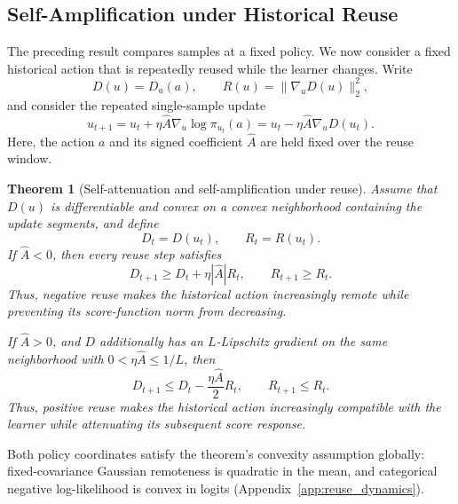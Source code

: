 \documentclass{article}
\theoremstyle{plain}
\newtheorem{theorem}{Theorem}[section]
\theoremstyle{definition}
\theoremstyle{remark}
\begin{document}
\subsection{Self-Amplification under Historical Reuse}
\label{sec:self_amplification}

The preceding result compares samples at a fixed policy. We now consider
a fixed historical action that is repeatedly reused while the learner
changes. Write
\[
    D(u)=D_u(a),
    \qquad
    R(u)=\|\nabla_uD(u)\|_2^2,
\]
and consider the repeated single-sample update
\begin{equation}
    u_{t+1}
    =
    u_t
    +
    \eta\widehat A\nabla_u\log\pi_{u_t}(a)
    =
    u_t
    -
    \eta\widehat A\nabla_uD(u_t).
    \label{eq:single_sample_reuse_update}
\end{equation}
Here, the action \(a\) and its signed coefficient \(\widehat A\) are
held fixed over the reuse window.

\begin{theorem}[Self-attenuation and self-amplification under reuse]
\label{thm:reuse_dynamics}
Assume that \(D(u)\) is differentiable and convex on a convex
neighborhood containing the update segments, and define
\[
    D_t=D(u_t),
    \qquad
    R_t=R(u_t).
\]
If \(\widehat A<0\), then every reuse step satisfies
\begin{equation}
    D_{t+1}
    \ge
    D_t+\eta|\widehat A|R_t,
    \qquad
    R_{t+1}\ge R_t.
    \label{eq:negative_reuse_amplification}
\end{equation}
Thus, negative reuse makes the historical action increasingly remote
while preventing its score-function norm from decreasing.

If \(\widehat A>0\), and \(D\) additionally has an \(L\)-Lipschitz
gradient on the same neighborhood with \(0<\eta\widehat A\le 1/L\), then
\begin{equation}
    D_{t+1}
    \le
    D_t-\frac{\eta\widehat A}{2}R_t,
    \qquad
    R_{t+1}\le R_t.
    \label{eq:positive_reuse_attenuation}
\end{equation}
Thus, positive reuse makes the historical action increasingly compatible
with the learner while attenuating its subsequent score response.
\end{theorem}

Both policy coordinates satisfy the theorem's convexity assumption
globally: fixed-covariance Gaussian remoteness is quadratic in the mean,
and categorical negative log-likelihood is convex in logits
(Appendix~\ref{app:reuse_dynamics}).
\end{document}
